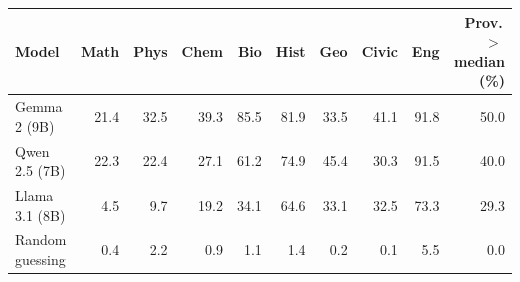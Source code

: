 \begin{tabular}{@{}lrrrrrrrrr@{}}
\toprule
Model & Math & Phys & Chem & Bio & Hist & Geo & Civic & Eng & Prov.\,$>$\,median (\%) \\
\midrule
Gemma 2 (9B) & 21.4 & 32.5 & 39.3 & 85.5 & 81.9 & 33.5 & 41.1 & 91.8 & 50.0 \\
Qwen 2.5 (7B) & 22.3 & 22.4 & 27.1 & 61.2 & 74.9 & 45.4 & 30.3 & 91.5 & 40.0 \\
Llama 3.1 (8B) & 4.5 & 9.7 & 19.2 & 34.1 & 64.6 & 33.1 & 32.5 & 73.3 & 29.3 \\
Random guessing & 0.4 & 2.2 & 0.9 & 1.1 & 1.4 & 0.2 & 0.1 & 5.5 & 0.0 \\
\bottomrule
\end{tabular}
